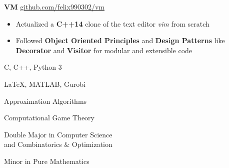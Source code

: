 \documentclass[11pt,a4paper,ragged2e]{altacv}
\begin{document}
\begin{paracol}{2}
\iffalse
\cvevent{Pleter}{}{May 2019}{\href{https://github.com/felix990302/word\_completion}{github.com/felix990302/word\_completion}}
\begin{itemize}
    \item Designed a concurrent auto-completion engine using a variation of \textbf{range trees} consisting of a \textbf{compressed trie} and sorted arrays in \textbf{C++}
    \item Accounted for race conditions and deadlocks using fine-grained read-write lock hierarchies
    \item Incorporated \textbf{gprof} as profiler for optimizations including a static \textbf{fixed-size allocator} to achieve \textbf{20x} speedup
\end{itemize}

\divider
\fi
\textbf{VM}
\hfill\href{https://github.com/felix990302/vm}{\faExternalLink* github.com/felix990302/vm}
\smallskip
\begin{itemize}
    \item Actualized a \textbf{C++14} clone of the text editor \emph{vim} from scratch
    \item Followed \textbf{Object Oriented Principles} and \textbf{Design Patterns} like \textbf{Decorator} and \textbf{Visitor} for modular and extensible code
\end{itemize}

\switchcolumn

C, C++, Python 3

\smallskip

\LaTeX, MATLAB, Gurobi

\divider\smallskip

Approximation Algorithms

\smallskip

Computational Game Theory

Double Major in Computer Science\\
and Combinatorics \& Optimization

\smallskip

Minor in Pure Mathematics

\smallskip


\end{paracol}
\end{document}
